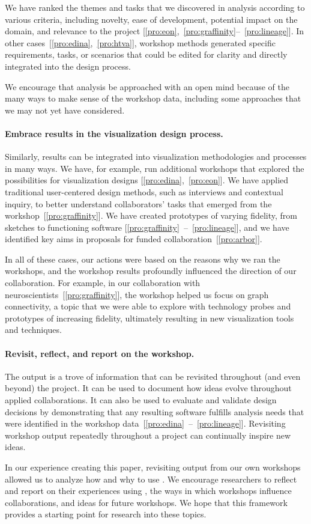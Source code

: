 We have ranked the themes and tasks that we discovered in analysis according to various criteria, including novelty, ease of development, potential impact on the domain, and relevance to the project [\ref{pro:eon},~\ref{pro:graffinity}--~\ref{pro:lineage}]. In other cases~[\ref{pro:edina},~\ref{pro:htva}], workshop methods generated specific requirements, tasks, or scenarios that could be edited for clarity and directly integrated into the design process. 

We encourage that analysis be approached with an open mind because of the many ways to make sense of the workshop data, including some approaches that we may not yet have considered.

\paragraph{Embrace results in the visualization design process.} Similarly, \workshop results can be integrated into visualization methodologies and processes in many ways. We have, for example, run additional workshops that explored the possibilities for visualization designs [\ref{pro:edina},~\ref{pro:eon}]. We have applied traditional user-centered design methods, such as interviews and contextual inquiry, to better understand collaborators' tasks that emerged from the workshop~[\ref{pro:graffinity}]. We have created prototypes of varying fidelity, from sketches to functioning software [\ref{pro:graffinity}~--~\ref{pro:lineage}], and we have identified key aims in proposals for funded collaboration~[\ref{pro:arbor}]. 

In all of these cases, our actions were based on the reasons why we ran the workshops, and the workshop results profoundly influenced the direction of our collaboration. For example, in our collaboration with neuroscientists~[\ref{pro:graffinity}], the workshop helped us focus on graph connectivity, a topic that we were able to explore with technology probes and prototypes of increasing fidelity, ultimately resulting in new visualization tools and techniques.

\paragraph{Revisit, reflect, and report on the workshop.} The \workshop output is a trove of information that can be revisited throughout (and even beyond) the project. It can be used to document how ideas evolve throughout applied collaborations. It can also be used to evaluate and validate design decisions by demonstrating that any resulting software fulfills analysis needs that were identified in the workshop data~[\ref{pro:edina}~--~\ref{pro:lineage}]. Revisiting workshop output repeatedly throughout a project can continually inspire new ideas.

In our experience creating this paper, revisiting output from our own workshops allowed us to analyze how and why to use \workshops.  We encourage researchers to reflect and report on their experiences using \workshops, the ways in which workshops influence collaborations, and ideas for future workshops. We hope that this framework provides a starting point for research into these topics.
